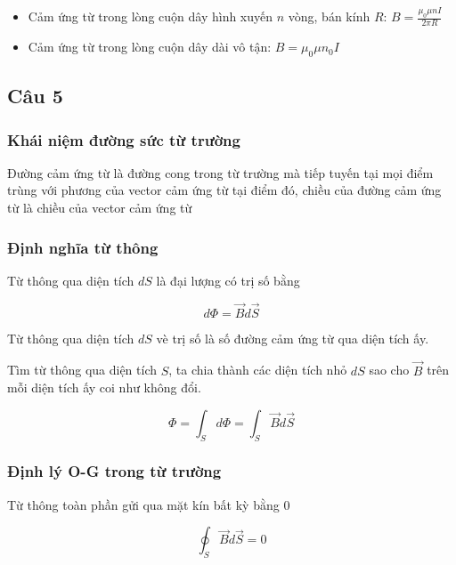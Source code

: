 \begin{itemize}
  \item Cảm ứng từ trong lòng cuộn dây hình xuyến $n$ vòng, bán kính $R$: $B = \frac{\mu_0 \mu nI}{2\pi R}$
  \item Cảm ứng từ trong lòng cuộn dây dài vô tận: $B = \mu_0\mu n_0I$
\end{itemize}

\subsection{Câu 5}

\subsubsection{Khái niệm đường sức từ trường}

Đường cảm ứng từ là đường cong trong từ trường mà tiếp tuyến tại mọi điểm trùng với phương của vector cảm ứng từ tại điểm đó, chiều của đường cảm ứng từ là chiều của vector cảm ứng từ

\subsubsection{Định nghĩa từ thông}

Từ thông qua diện tích $dS$ là đại lượng có trị số bằng 

\begin{equation*}
  d\Phi = \vec{B}d\vec{S}
\end{equation*}

Từ thông qua diện tích $dS$ vè trị số là số đường cảm ứng từ qua diện tích ấy.

Tìm từ thông qua diện tích $S$, ta chia thành các diện tích nhỏ $dS$ sao cho $\vec{B}$ trên mỗi diện tích ấy coi như không đổi.

\begin{equation*}
  \Phi = \int_S d\Phi = \int_S \vec{B}d\vec{S}
\end{equation*}

\subsubsection{Định lý O-G trong từ trường}

Từ thông toàn phần gửi qua mặt kín bất kỳ bằng 0

\begin{equation*}
  \oint_S \vec{B}d\vec{S} = 0
\end{equation*}

